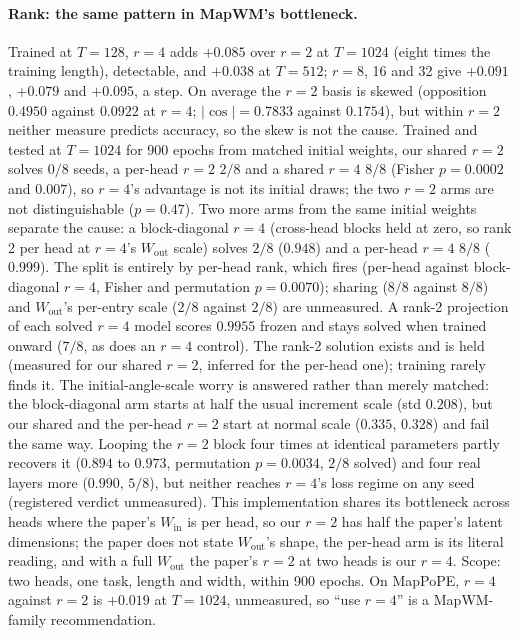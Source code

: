 \documentclass[10pt]{article}
\begin{document}
\paragraph{Rank: the same pattern in MapWM's bottleneck.} Trained at $T=128$, $r=4$ adds $+0.085$ over $r=2$
at $T=1024$ (eight times the training length), detectable, and $+0.038$ at $T=512$; $r=8$, 16 and 32 give
$+0.091$, $+0.079$ and $+0.095$, a step. On average the $r=2$ basis is skewed (opposition $0.4950$ against $0.0922$
at $r=4$; $|\cos| = 0.7833$ against $0.1754$), but within $r=2$ neither measure predicts accuracy, so the skew is not
the cause. Trained and tested at $T=1024$ for 900 epochs from matched initial weights, our shared $r=2$ solves $0/8$
seeds, a per-head $r=2$ $2/8$ and a shared $r=4$ $8/8$ (Fisher $p=0.0002$ and $0.007$), so $r=4$'s advantage is not
its initial draws; the two $r=2$ arms are not distinguishable ($p=0.47$). Two more arms from the same initial
weights separate the cause: a block-diagonal $r=4$ (cross-head blocks held at zero, so rank 2 per head at $r=4$'s
$W_{\mathrm{out}}$ scale) solves $2/8$ ($0.948$) and a per-head $r=4$ $8/8$ ($0.999$). The split is entirely by
per-head rank, which fires (per-head against block-diagonal $r=4$, Fisher and permutation $p=0.0070$); sharing
($8/8$ against $8/8$) and $W_{\mathrm{out}}$'s per-entry scale ($2/8$ against $2/8$) are unmeasured. A rank-2
projection of each solved $r=4$ model scores $0.9955$ frozen and stays solved when trained onward ($7/8$, as does
an $r=4$ control). The rank-2 solution exists and is held (measured for our shared $r=2$, inferred for the per-head
one); training rarely finds it. The initial-angle-scale worry is answered rather than merely matched: the
block-diagonal arm starts at half the usual increment scale (std $0.208$), but our shared and the per-head $r=2$
start at normal scale ($0.335$, $0.328$) and fail the same way. Looping the $r=2$ block four times at identical
parameters partly recovers it ($0.894$ to $0.973$, permutation $p=0.0034$, $2/8$ solved) and four real layers
more ($0.990$, $5/8$), but neither reaches $r=4$'s loss regime on any seed (registered verdict unmeasured). This
implementation shares its bottleneck across heads where the paper's $W_{\mathrm{in}}$ is per head, so our $r=2$ has
half the paper's latent dimensions; the paper does not state $W_{\mathrm{out}}$'s shape, the per-head arm is its
literal reading, and with a full $W_{\mathrm{out}}$ the paper's $r=2$ at two heads is our $r=4$. Scope: two heads,
one task, length and width, within 900 epochs. On MapPoPE, $r=4$ against $r=2$ is $+0.019$ at $T=1024$,
unmeasured, so ``use $r=4$'' is a MapWM-family recommendation.
\end{document}
